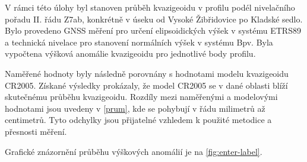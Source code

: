\tab  V rámci této úlohy byl stanoven průběh kvazigeoidu v profilu podél nivelačního pořadu II. řádu Z7ab, konkrétně v úseku od Vysoké Žibřidovice po Kladské sedlo. Bylo provedeno GNSS měření pro určení elipsoidických výšek v systému ETRS89 a technická nivelace pro stanovení normálních výšek v systému Bpv. Byla vypočtena výšková anomálie kvazigeoidu pro jednotlivé body profilu.

Naměřené hodnoty byly následně porovnány s hodnotami modelu kvazigeoidu CR2005. Získané výsledky prokázaly, že model CR2005 se v dané oblasti blíží skutečnému průběhu kvazigeoidu. Rozdíly mezi naměřenými a modelovými hodnotami jsou uvedeny v \ref{prum}, kde se pohybují v řádu milimetrů až centimetrů. Tyto odchylky jsou přijatelné vzhledem k použité metodice a přesnosti měření. 

Grafické znázornění průběhu výškových anomálií je na \ref{fig:enter-label}.